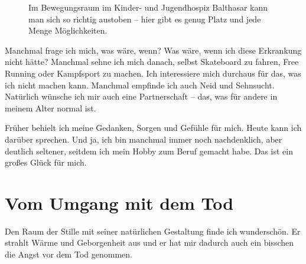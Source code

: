 \documentclass[fontsize=14pt,a4paper,headinclude,DIV=calc,automark]{scrbook}
\begin{document}
\setlength{\fboxsep}{0pt}    %
\setlength{\fboxrule}{0.2pt} %
\begin{figure}[H]
    \centering
    \caption{Im Bewegungsraum im Kinder- und Jugendhospiz Balthasar kann man sich so richtig austoben – hier gibt es genug Platz und jede Menge Möglichkeiten.}
    \label{fig:bewegungsraum}
\end{figure}

Manchmal frage ich mich, was wäre, wenn? Was wäre, wenn ich diese Erkrankung nicht hätte? Manchmal sehne ich mich danach, selbst Skateboard zu fahren, Free Running oder Kampfsport zu machen. Ich interessiere mich durchaus für das, was ich nicht machen kann. Manchmal empfinde ich auch Neid und Sehnsucht. Natürlich wünsche ich mir auch eine Partnerschaft – das, was für andere in meinem Alter normal ist.

Früher behielt ich meine Gedanken, Sorgen und Gefühle für mich. Heute kann ich darüber sprechen. Und ja, ich bin manchmal immer noch nachdenklich, aber deutlich seltener, seitdem ich mein Hobby zum Beruf gemacht habe. Das ist ein großes Glück für mich.

\section{Vom Umgang mit dem Tod}

Den Raum der Stille mit seiner natürlichen Gestaltung finde ich wunderschön. Er strahlt Wärme und Geborgenheit aus und er hat mir dadurch auch ein bisschen die Angst vor dem Tod genommen.
\end{document}
